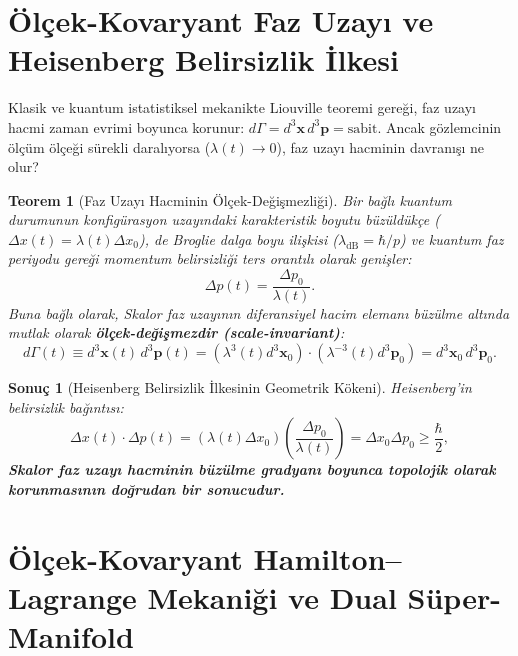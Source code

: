 \documentclass[11pt,a4paper]{article}
\newtheorem{theorem}{Teorem}[section]
\newtheorem{corollary}{Sonuç}[theorem]
\begin{document}
\section{Ölçek-Kovaryant Faz Uzayı ve Heisenberg Belirsizlik İlkesi}
\label{sec:faz_uzayi_heisenberg}

Klasik ve kuantum istatistiksel mekanikte Liouville teoremi gereği, faz uzayı hacmi zaman evrimi boyunca korunur: $d\Gamma = d^3\mathbf{x} \, d^3\mathbf{p} = \text{sabit}$. Ancak gözlemcinin ölçüm ölçeği sürekli daralıyorsa ($\lambda(t) \to 0$), faz uzayı hacminin davranışı ne olur?

\begin{theorem}[Faz Uzayı Hacminin Ölçek-Değişmezliği]
    \label{thm:faz_uzayi_degismezligi_sc}
    Bir bağlı kuantum durumunun konfigürasyon uzayındaki karakteristik boyutu büzüldükçe ($\Delta x(t) = \lambda(t) \Delta x_0$), de Broglie dalga boyu ilişkisi ($\lambda_{\mathrm{dB}} = \hbar / p$) ve kuantum faz periyodu gereği momentum belirsizliği ters orantılı olarak genişler:
    \begin{equation}
        \Delta p(t) = \frac{\Delta p_0}{\lambda(t)}.
        \label{eq:momentum_genlesme}
    \end{equation}
    Buna bağlı olarak, Skalor faz uzayının diferansiyel hacim elemanı büzülme altında mutlak olarak \textbf{ölçek-değişmezdir (scale-invariant)}:
    \begin{equation}
        d\Gamma(t) \equiv d^3\mathbf{x}(t) \, d^3\mathbf{p}(t) = \left( \lambda^3(t) d^3\mathbf{x}_0 \right) \cdot \left( \lambda^{-3}(t) d^3\mathbf{p}_0 \right) = d^3\mathbf{x}_0 \, d^3\mathbf{p}_0.
        \label{eq:faz_hacmi_korunumu}
    \end{equation}
\end{theorem}

\begin{corollary}[Heisenberg Belirsizlik İlkesinin Geometrik Kökeni]
    \label{cor:heisenberg_kokeni_sc}
    Heisenberg'in belirsizlik bağıntısı:
    \begin{equation}
        \Delta x(t) \cdot \Delta p(t) = \left( \lambda(t) \Delta x_0 \right) \left( \frac{\Delta p_0}{\lambda(t)} \right) = \Delta x_0 \Delta p_0 \ge \frac{\hbar}{2},
        \label{eq:heisenberg_turetilis}
    \end{equation}
    \textbf{Skalor faz uzayı hacminin büzülme gradyanı boyunca topolojik olarak korunmasının doğrudan bir sonucudur.}
\end{corollary}

\section{Ölçek-Kovaryant Hamilton--Lagrange Mekaniği ve Dual Süper-Manifold}
\label{sec:lagrange_mekanigi}
\end{document}
